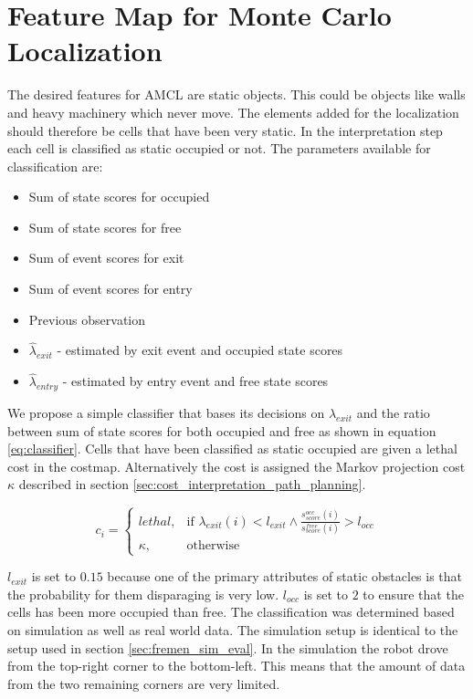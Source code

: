 \section{Feature Map for Monte Carlo Localization}
\label{sec:localzation_feature_map}
The desired features for AMCL are static objects. 
This could be objects like walls and heavy machinery which never move.  
The elements added for the localization should therefore be cells that have been very static. 
In the interpretation step each cell is classified as static occupied or not. 
The parameters available for classification are:
\begin{itemize} 
\item Sum of state scores for occupied
\item Sum of state scores for free
\item Sum of event scores for exit
\item Sum of event scores for entry
\item Previous observation
\item \(\hat{\lambda}_{exit}\) - estimated by exit event and occupied state scores
\item \(\hat{\lambda}_{entry}\) - estimated by entry event and free state scores
\end{itemize}

We propose a simple classifier that bases its decisions on \(\lambda_{exit}\) and the ratio between sum of state scores for both occupied and free as shown in equation \ref{eq:classifier}. 
Cells that have been classified as static occupied are given a lethal cost in the costmap. Alternatively the cost is assigned the Markov projection cost $\kappa$ described in section \ref{sec:cost_interpretation_path_planning}. 

\begin{equation}
\label{eq:classifier}
c_i = 
\begin{cases}
lethal, & \text{if } \lambda_{exit}(i) < l_{exit} \land \frac{s_{score}^{occ}(i)}{s_{score}^{free}(i)}  > l_{occ}
\\
\kappa, & \text{otherwise}
\end{cases}
\end{equation}

$l_{exit}$ is set to $0.15$ because one of the primary attributes of static obstacles is that the probability for them disparaging is very low.
$l_{occ}$ is set to $2$ to ensure that the cells has been more occupied than free. 
The classification was determined based on simulation as well as real world data.
The simulation setup is identical to the setup used in section \ref{sec:fremen_sim_eval}. 
In the simulation the robot drove from the top-right corner to the bottom-left. This means that the amount of data from the two remaining corners are very limited.

